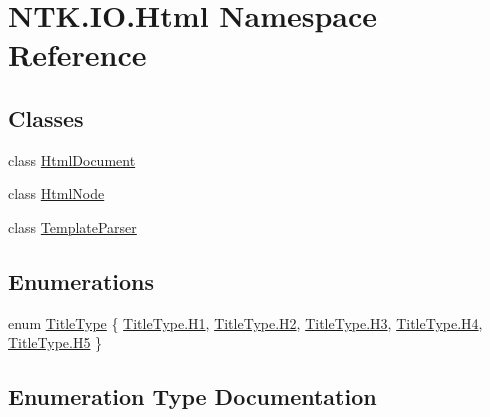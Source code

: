 \hypertarget{namespace_n_t_k_1_1_i_o_1_1_html}{}\section{N\+T\+K.\+I\+O.\+Html Namespace Reference}
\label{namespace_n_t_k_1_1_i_o_1_1_html}
\subsection*{Classes}
\begin{DoxyCompactItemize}
\item 
class \mbox{\hyperlink{class_n_t_k_1_1_i_o_1_1_html_1_1_html_document}{Html\+Document}}
\item 
class \mbox{\hyperlink{class_n_t_k_1_1_i_o_1_1_html_1_1_html_node}{Html\+Node}}
\item 
class \mbox{\hyperlink{class_n_t_k_1_1_i_o_1_1_html_1_1_template_parser}{Template\+Parser}}
\end{DoxyCompactItemize}
\subsection*{Enumerations}
\begin{DoxyCompactItemize}
\item 
enum \mbox{\hyperlink{namespace_n_t_k_1_1_i_o_1_1_html_a871eb4a91323a2ea84afdabe1ac01ce3}{Title\+Type}} \{ \newline
\mbox{\hyperlink{namespace_n_t_k_1_1_i_o_1_1_html_a871eb4a91323a2ea84afdabe1ac01ce3a106530dc42baa21c67f8a3af4d7fd9e1}{Title\+Type.\+H1}}, 
\mbox{\hyperlink{namespace_n_t_k_1_1_i_o_1_1_html_a871eb4a91323a2ea84afdabe1ac01ce3aca2bf3f6b7e18a508253e9521510a4b5}{Title\+Type.\+H2}}, 
\mbox{\hyperlink{namespace_n_t_k_1_1_i_o_1_1_html_a871eb4a91323a2ea84afdabe1ac01ce3ab14763210c3ab7284e9cbe731d7dc2a5}{Title\+Type.\+H3}}, 
\mbox{\hyperlink{namespace_n_t_k_1_1_i_o_1_1_html_a871eb4a91323a2ea84afdabe1ac01ce3a6b57370ba89bd88a2d6d819d65f6007a}{Title\+Type.\+H4}}, 
\newline
\mbox{\hyperlink{namespace_n_t_k_1_1_i_o_1_1_html_a871eb4a91323a2ea84afdabe1ac01ce3a830652084dda69b6b957e2c3a7bd9b18}{Title\+Type.\+H5}}
 \}
\end{DoxyCompactItemize}


\subsection{Enumeration Type Documentation}
\mbox{\label{namespace_n_t_k_1_1_i_o_1_1_html_a871eb4a91323a2ea84afdabe1ac01ce3}} 
